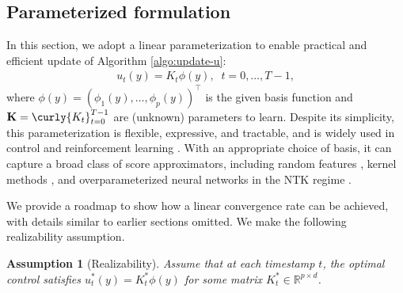 \documentclass{article}
\newtheorem{Assumption}[Theorem]{Assumption}
\newcommand{\R}{\mathbb{R}}
\begin{document}
\subsection{Parameterized formulation}
{\color{black}In this section, we adopt a linear parameterization to enable practical and  efficient update of Algorithm \ref{algo:update-u}:
\begin{align*}
    u_t(y) = K_t\phi(y), \;\; t = 0, \dots, T - 1,
\end{align*}
where $\phi(y) = (\phi_1(y), \dots, \phi_p(y))^\top$ is the given basis function and ${\bf K} = \curly{K_t}_{t = 0}^{T - 1}$ are (unknown) parameters to learn. Despite its simplicity, this parameterization is flexible, expressive, and tractable, and is widely used in control and reinforcement learning \citep{Agarwal2021OnTT,jin2020provably}. With an appropriate choice of basis, it can capture a broad class of score approximators, including random features \citep{rahimi2007random}, kernel methods \citep{steinwart2008support}, and overparameterized neural networks in the NTK regime \citep{jacot2018neural}.}

We provide a roadmap to show how a linear convergence rate can be achieved, with details similar to earlier sections omitted. We make the following realizability assumption. 

\begin{Assumption}[Realizability]
Assume that at each timestamp $t$, the optimal control satisfies $u_t^*(y) = K_t^*\phi(y)$ for some matrix $K_t^* \in \R^{p \times d}$. 
\end{Assumption}
\end{document}
